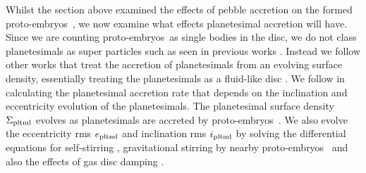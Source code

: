 \documentclass[a4paper,fleqn,usenatbib]{mnras}
\newcommand{\embs}{{{proto-embryos~}}}
\begin{document}
Whilst the section above examined the effects of pebble accretion on the formed \embs , we now examine what effects planetesimal accretion will have.
Since we are counting \embs as single bodies in the disc, we do not class planetesimals as super particles such as seen in previous works \citep[e.g.][]{ColemanNelson14,ColemanNelson16,ColemanNelson16b}.
Instead we follow other works that treat the accretion of planetesimals from an evolving surface density, essentially treating the planetesimals as a fluid-like disc \citep[e.g.][]{Alibert2006,Ida13,Mordasini15}.
We follow \citet{Fortier13} in calculating the planetesimal accretion rate that depends on the inclination and eccentricity evolution of the planetesimals.
The planetesimal surface density $\Sigma_{\rm pltml}$ evolves as planetesimals are accreted by \embs.
We also evolve the eccentricity rms $e_{\rm pltml}$ and inclination rms $i_{\rm pltml}$ by solving the differential equations for self-stirring \citep{Ohtsuki99}, gravitational stirring by nearby \embs \citep{Ohtsuki99} and also the effects of gas disc damping \citep{Adachi,Inaba01,Rafikov04}.
\end{document}
